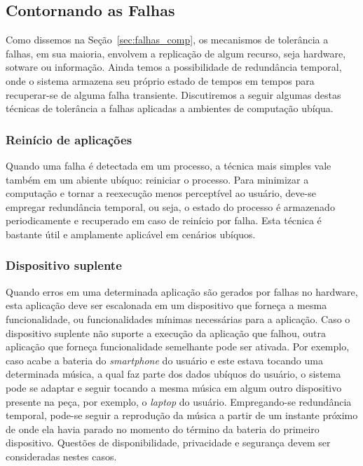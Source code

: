 
\subsection{Contornando as Falhas} %
\label{sub:contornando_as_falhas}

Como dissemos na Seção~\ref{sec:falhas_comp}, os mecanismos de tolerância a falhas, em sua maioria, envolvem a replicação de algum recurso, seja hardware, sotware ou informação. Ainda temos a possibilidade de redundância temporal, onde o sistema armazena seu próprio estado de tempos em tempos para recuperar-se de alguma falha transiente. Discutiremos a seguir algumas destas técnicas de tolerância a falhas aplicadas a ambientes de computação ubíqua.

\subsubsection*{Reinício de aplicações} %

Quando uma falha é detectada em um processo, a técnica mais simples vale também em um abiente ubíquo: reiniciar o processo. Para minimizar a computação e tornar a reexecução menos perceptível ao usuário, deve-se empregar redundância temporal, ou seja, o estado do processo é armazenado periodicamente e recuperado em caso de reinício por falha. Esta técnica é bastante útil e amplamente aplicável em cenários ubíquos.


\subsubsection*{Dispositivo suplente} %

Quando erros em uma determinada aplicação são gerados por falhas no hardware, esta aplicação deve ser escalonada em um dispositivo que forneça a mesma funcionalidade, ou funcionalidades mínimas necessárias para a aplicação. Caso o dispositivo suplente não suporte a execução da aplicação que falhou, outra aplicação que forneça funcionalidade semelhante pode ser ativada. Por exemplo, caso acabe a bateria do \emph{smartphone} do usuário e este estava tocando uma determinada música, a qual faz parte dos dados ubíquos do usuário, o sistema pode se adaptar e seguir tocando a mesma música em algum outro dispositivo presente na peça, por exemplo, o \emph{laptop} do usuário. Empregando-se redundância temporal, pode-se seguir a reprodução da música a partir de um instante próximo de onde ela havia parado no momento do término da bateria do primeiro dispositivo. Questões de disponibilidade, privacidade e segurança devem ser consideradas nestes casos.

